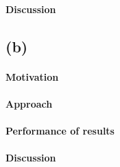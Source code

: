 \paragraph{Discussion}

\subsection{(b)}

\paragraph{Motivation}

\paragraph{Approach} 

\paragraph{Performance of results}

\paragraph{Discussion}
